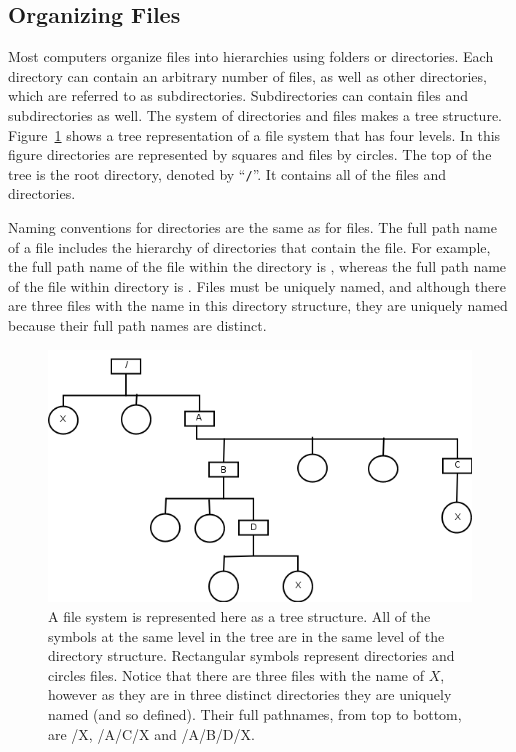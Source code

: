\subsection{Organizing Files}
Most computers organize files into hierarchies using folders or
directories. Each directory can contain an arbitrary number of files,
as well as other directories, which are referred to as
subdirectories. Subdirectories can contain files and subdirectories as
well. The system of directories and files makes a tree
structure. Figure~\ref{fig:tree} shows a tree representation of a file
system that has four levels. In this figure directories are
represented by squares and files by circles. The top of the tree is
the root directory, denoted by ``\verb+/+''. It contains all of the
files and directories.

Naming conventions for directories are the same as for files.  The
full path name of a file includes the hierarchy of directories that
contain the file.  For example, the full path name of the file
 within the directory  is , whereas
the full path name of the file  within directory  is
.  Files must be uniquely named, and although there are
three files with the name  in this directory structure, they
are uniquely named because their full path names are distinct.

\begin{figure}
\includegraphics[width=5in]{computerIntro/images/fileTree.png}
\caption{A file system is represented here as a tree structure.  All
  of the symbols at the same level in the tree are in the same level
  of the directory structure.  Rectangular symbols represent
  directories and circles files.  Notice that there are three files
  with the name of $X$, however as they are in three distinct
  directories they are uniquely named (and so defined).  Their full
  pathnames, from top to bottom, are /X, /A/C/X and /A/B/D/X.}
\label{fig:tree}
\end{figure}

